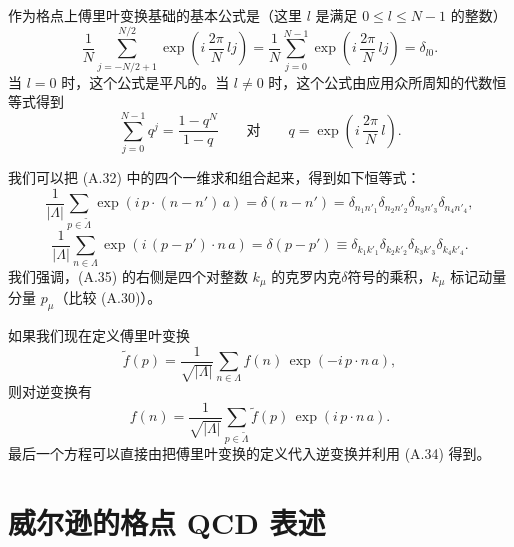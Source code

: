 作为格点上傅里叶变换基础的基本公式是（这里 $l$ 是满足 $0 \le l \le N - 1$ 的整数）
\begin{equation}
  \frac{1}{N}\sum_{j=-N/2+1}^{N/2}\exp\!\left(i\,\frac{2\pi}{N}\,lj\right)
  = \frac{1}{N}\sum_{j=0}^{N-1}\exp\!\left(i\,\frac{2\pi}{N}\,lj\right) = \delta_{l0}.
\end{equation}
当 $l = 0$ 时，这个公式是平凡的。当 $l \ne 0$ 时，这个公式由应用众所周知的代数恒等式得到
\begin{equation}
  \sum_{j=0}^{N-1}q^j = \frac{1 - q^N}{1 - q} \qquad \text{对} \qquad
  q = \exp\!\left(i\,\frac{2\pi}{N}\,l\right).
\end{equation}

我们可以把 (A.32) 中的四个一维求和组合起来，得到如下恒等式：
\begin{equation}
  \frac{1}{|\Lambda|}\sum_{p\in\tilde{\Lambda}}\exp\!\left(i\,p\cdot(n-n')\,a\right)
  = \delta(n-n') = \delta_{n_1n'_1}\delta_{n_2n'_2}\delta_{n_3n'_3}\delta_{n_4n'_4},
\end{equation}
\begin{equation}
  \frac{1}{|\Lambda|}\sum_{n\in\Lambda}\exp\!\left(i\,(p-p')\cdot n\,a\right)
  = \delta(p-p') \equiv \delta_{k_1k'_1}\delta_{k_2k'_2}\delta_{k_3k'_3}\delta_{k_4k'_4}.
\end{equation}
我们强调，(A.35) 的右侧是四个对整数 $k_\mu$ 的克罗内克$\delta$符号的乘积，$k_\mu$ 标记动量分量 $p_\mu$（比较 (A.30)）。

如果我们现在定义傅里叶变换
\begin{equation}
  \tilde{f}(p) = \frac{1}{\sqrt{|\Lambda|}}\sum_{n\in\Lambda}f(n)\,\exp(-i\,p\cdot n\,a),
\end{equation}
则对逆变换有
\begin{equation}
  f(n) = \frac{1}{\sqrt{|\Lambda|}}\sum_{p\in\tilde{\Lambda}}\tilde{f}(p)\,\exp(i\,p\cdot n\,a).
\end{equation}
最后一个方程可以直接由把傅里叶变换的定义代入逆变换并利用 (A.34) 得到。

\section{威尔逊的格点 QCD 表述}

